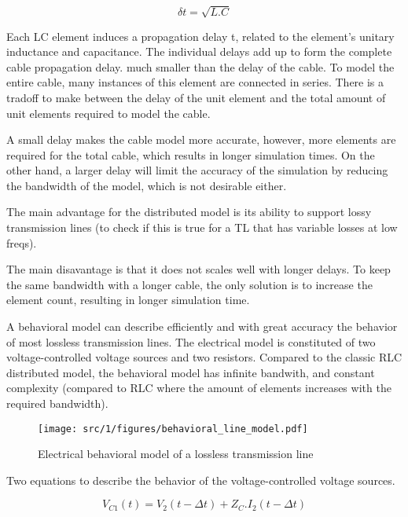\begin{equation}
\delta t = \sqrt{L.C}
\end{equation}

Each LC element induces a propagation delay \textdelta{}t, related to the element's unitary inductance and capacitance.
The individual delays add up to form the complete cable propagation delay.
much smaller than the delay of the cable.
To model the entire cable, many instances of this element are connected in series.
There is a tradoff to make between the delay of the unit element and the total amount of unit elements required to model the cable.

A small delay makes the cable model more accurate, however, more elements are required for the total cable, which results in longer simulation times.
On the other hand, a larger delay will limit the accuracy of the simulation by reducing the bandwidth of the model, which is not desirable either.

The main advantage for the distributed model is its ability to support lossy transmission lines (to check if this is true for a TL that has variable losses at low freqs).

The main disavantage is that it does not scales well with longer delays.
To keep the same bandwidth with a longer cable, the only solution is to increase the element count, resulting in longer simulation time.

A behavioral model can describe efficiently and with great accuracy the behavior of most lossless transmission lines.
The electrical model is constituted of two voltage-controlled voltage sources and two resistors.
Compared to the classic RLC distributed model, the behavioral model has infinite bandwith, and constant complexity (compared to RLC where the amount of elements increases with the required bandwidth).

\begin{figure}[!h]
  \centering
  \texttt{[image: src/1/figures/behavioral\_line\_model.pdf]}
  \caption{Electrical behavioral model of a lossless transmission line}
  \label{fig:beh-line-model}
\end{figure}

Two equations to describe the behavior of the voltage-controlled voltage sources.

\begin{equation}
V_{C1}(t) = V_{2}(t - \Delta t) + Z_{C}.I_{2}(t - \Delta t)
\end{equation}

